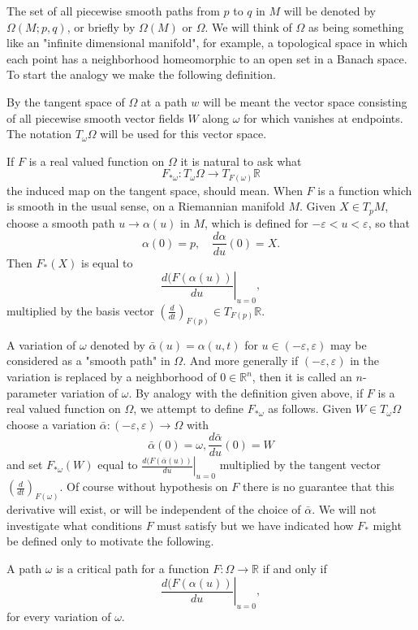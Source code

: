 \documentclass{ctexart}
\begin{document}
The set of all piecewise smooth paths from $p$ to $q$ in $M$ will be denoted by $\Omega(M ; p, q)$, or briefly by $\Omega(M)$ or $\Omega$.
We will think of $\Omega$ as being something like an "infinite dimensional manifold", for example, a topological space in which each point has a neighborhood 
homeomorphic to an open set in a Banach space. To start the analogy we make the following definition.

By the tangent space of $\Omega$ at a path $w$ will be meant the vector space consisting of all piecewise smooth vector fields $W$ along $\omega$ for which vanishes 
at endpoints. The notation $T_\omega \Omega$ will be used for this vector space.

If $F$ is a real valued function on $\Omega$ it is natural to ask what
$$
F_{*\omega}: T_\omega \Omega \rightarrow T_{F(\omega)} \mathbb{R}
$$
the induced map on the tangent space, should mean. When $F$ is a function which is smooth in the usual sense, on a Riemannian manifold $M$. 
Given $X \in T_p M$, choose a smooth path $u \rightarrow \alpha(u)$ in $M$, which is defined for $-\varepsilon<u<\varepsilon$, so that
$$
\alpha(0)=p, \quad \frac{d \alpha}{d u}(0)=X. 
$$
Then $F_*(X)$ is equal to 
$$
\left.\frac{d(F(\alpha(u))}{d u}\right|_{u=0},
$$
multiplied by the basis vector $\left(\frac{d}{d t}\right)_{F(p)} \in T_{F(p)}\mathbb{R}$. 

A variation of $\omega$ denoted by $\bar{\alpha}(u)=\alpha(u,t)$ for $u\in (-\varepsilon,\varepsilon)$ may be considered as a "smooth path" in $\Omega$. 
And more generally if $(-\varepsilon,\varepsilon)$ in the variation is replaced by a neighborhood of $0\in\mathbb{R}^n$, 
then it is called an $n$-parameter variation of $\omega$. By analogy with the definition given above, if $F$ is a real valued function on $\Omega$, 
we attempt to define $F_{*\omega}$
as follows. Given $W \in T_\omega \Omega$ choose a variation $\bar{\alpha}:(-\varepsilon, \varepsilon) \rightarrow \Omega$ with
$$
\bar{\alpha}(0)=\omega, \frac{d \bar{\alpha}}{d u}(0)=W
$$
and set $F_{* \omega}(W)$ equal to $\left.\frac{d(F(\bar{\alpha}(u))}{d u}\right|_{u=0}$ multiplied by the tangent vector
$\left(\frac{d}{d t}\right)_{F(\omega)}$. Of course without hypothesis on $F$ there is no guarantee that
this derivative will exist, or will be independent of the choice of $\bar{\alpha}$.
We will not investigate what conditions $F$ must satisfy but we have indicated how $F_*$ might be defined only to motivate the following.
\begin{definition}
  A path $\omega$ is a critical path for a function $F: \Omega\rightarrow \mathbb{R}$ if and only if
  $$
  \left.\frac{d(F(\alpha(u))}{d u}\right|_{u=0},
  $$
  for every variation of $\omega$. 
\end{definition}
\end{document}
